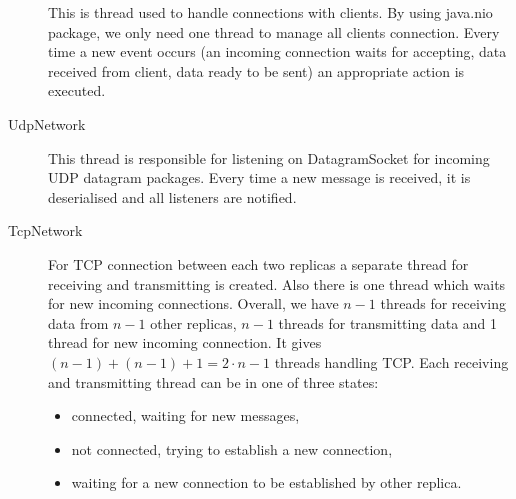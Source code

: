 \begin{description}
    This is thread used to handle connections with clients. By using java.nio package, we only need one thread to manage all clients connection. Every time a new event occurs (an incoming connection waits for accepting, data received from client, data ready to be sent) an appropriate action is executed. 

  \item[UdpNetwork] \hfill

    This thread is responsible for listening on DatagramSocket for incoming UDP datagram packages. Every time a new message is received, it is deserialised and all listeners are notified.

  \item[TcpNetwork] \hfill

    For TCP connection between each two replicas a separate thread for receiving and transmitting is created. Also there is one thread which waits for new incoming connections. Overall, we have $n-1$ threads for receiving data from $n-1$ other replicas, $n-1$ threads for transmitting data and 1 thread for new incoming connection. It gives $(n - 1) + (n - 1) + 1 = 2 \cdot n - 1$ threads handling TCP. Each receiving and transmitting thread can be in one of three states:
    \begin{itemize}
            \item connected, waiting for new messages,
            \item not connected, trying to establish a new connection,
            \item waiting for a new connection to be established by other replica.
    \end{itemize}
\end{description}
